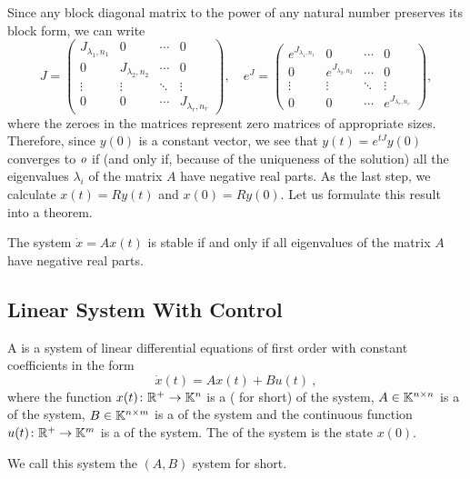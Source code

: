 Since any block diagonal matrix to the power of any natural number preserves its block form, we can write
\begin{equation*}
	J=
	\begin{pmatrix}
		J_{\lambda_1,n_1} & 0 & \cdots & 0 \\
		0 & J_{\lambda_2,n_2} & \cdots & 0 \\
		\vdots & \vdots & \ddots & \vdots \\
		0 & 0 & \cdots & J_{\lambda_r,n_r}
	\end{pmatrix},
	\quad 
	e^J=
	\begin{pmatrix}
		e^{J_{\lambda_1,n_1}} & 0 & \cdots & 0 \\
		0 & e^{J_{\lambda_2,n_2}} & \cdots & 0 \\
		\vdots & \vdots & \ddots & \vdots \\
		0 & 0 & \cdots & e^{J_{\lambda_r,n_r}}
	\end{pmatrix}
	,
\end{equation*}
where the zeroes in the matrices represent zero matrices of appropriate sizes. Therefore, since $y(0)$ is a constant vector, we see that $y(t)=e^{tJ}y(0)$ converges to $\textit{o}$ if (and only if, because of the uniqueness of the solution) all the eigenvalues $\lambda_i$ of the matrix $A$ have negative real parts. As the last step, we calculate $x(t)=Ry(t)$ and $x(0)=Ry(0)$. Let us formulate this result into a theorem.

\begin{theorem}
\label{theorem:stability}
	The system $\dot{x}=Ax(t)$ is stable if and only if all eigenvalues of the matrix $A$ have negative real parts.
\end{theorem}

\subsection{Linear System With Control}

\begin{definition}
	A  is a system of linear differential equations of first order with constant coefficients in the form $$\dot{x}(t)=Ax(t)+Bu(t)\ ,$$ where the function $x(t)\colon\mathbb{R}^+\to\mathbb{K}^n$ is a  ( for short) of the system, $A\in\mathbb{K}^{n\times n}$ is a  of the system, $B\in\mathbb{K}^{n\times m}$ is a  of the system and the continuous function $u(t)\colon\mathbb{R}^+\to\mathbb{K}^m$ is a  of the system. The  of the system is the state $x(0)$.

	We call this system the $(A,B)$ system for short.
\end{definition}

